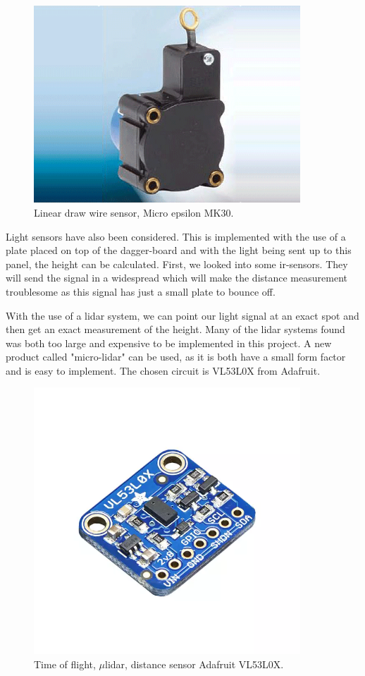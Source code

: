 \begin{figure}[H]%
\begin{center}
	\includegraphics[width = 10cm]{Figures/microepsilon_mk30.png}
	\caption{Linear draw wire sensor, Micro epsilon MK30.}
	\label{Draw_sensor}
\end{center}
\end{figure}

Light sensors have also been considered. This is implemented with the use of a plate placed on top of the dagger-board and with the light being sent up to this panel, the height can be calculated. First, we looked into some \gls{ir}-sensors. They will send the signal in a widespread which will make the distance measurement troublesome as this signal has just a small plate to bounce off.

With the use of a \gls{lidar} system, we can point our light signal at an exact spot and then get an exact measurement of the height.  
Many of the \gls{lidar} systems found was both too large and expensive to be implemented in this project.
A new product called "micro-lidar" can be used, as it is both have a small form factor and is easy to implement.
The chosen circuit is VL53L0X from Adafruit\cite{micro_lidar}. 

\begin{figure}[H]
	\centering
	\includegraphics[width = 10cm]{Figures/Adafruit_height_sensor.png}
	\caption{Time of flight, $\mu$\gls{lidar}, distance sensor Adafruit VL53L0X.}
	\label{micro_lidar}
\end{figure}

